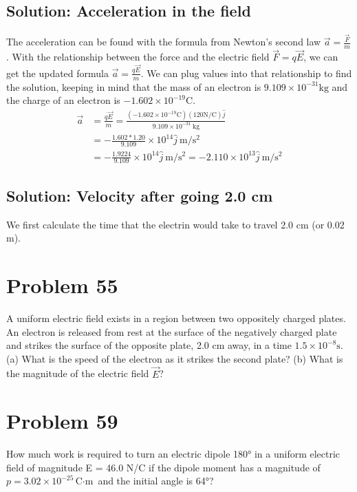 \documentclass[12pt]{article}
\begin{document}
\subsection{Solution: Acceleration in the field}
The acceleration can be found with the formula from Newton's second law \(\vec{a} = \frac{\vec{F}}{m}\).
With the relationship between the force and the electric field \(\vec{F} = q\vec{E}\), we can get the updated formula \(\vec{a} = \frac{q\vec{E}}{m}\). 
We can plug values into that relationship to find the solution, keeping in mind that the mass of an electron is $9.109 \times 10^{-31} \unit{\kilo\gram}$ and the charge of an electron is $-1.602 \times 10^{-19} \unit{\coulomb}$.
\begin{align*}
    \vec{a} &=  \frac{q\vec{E}}{m} = \frac{(-1.602 \times 10^{-19} \unit{\coulomb})(120 \unit{\newton/\coulomb})\hat{j}}{9.109 \times 10^{-31}\ \unit{\kilo\gram}}\\
        &=  -\frac{1.602 * 1.20}{9.109} \times 10^{14}\hat{j}\ \unit{\meter/\second^2}\\
        &=  -\frac{1.9224}{9.109} \times 10^{14}\hat{j}\ \unit{\meter/\second^2}
        =   \boxed{-2.110 \times 10^{13} \hat{j}\ \unit{\meter/\second^2}}
\end{align*}

\subsection{Solution: Velocity after going 2.0 cm}
We first calculate the time that the electrin would take to travel 2.0 cm (or 0.02 m).

\pagebreak
\section{Problem 55}
A uniform electric field exists in a region between two oppositely charged plates. An electron is released from rest at the surface of the negatively charged plate and strikes the surface of the opposite plate, 2.0 cm away, in a time $1.5 \times 10^{-8} \unit{\second}$. (a) What is the speed of the electron as it strikes the second plate? (b) What is the magnitude of the electric field $\vec{E}$?

\section{Problem 59}
How much work is required to turn an electric dipole 180\unit{\degree} in a uniform electric field of magnitude E = 46.0 N/C if the dipole moment has a magnitude of $p = 3.02 \times 10^{-25} \unit{\coulomb\cdot\meter}$ and the initial angle is 64\unit{\degree}?
\end{document}
